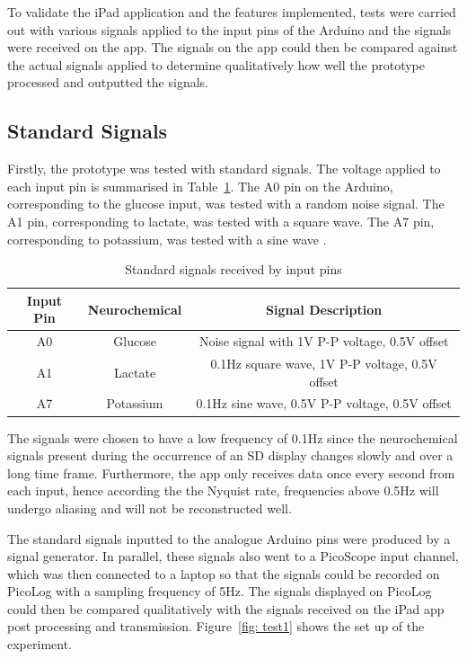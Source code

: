 To validate the iPad application and the features implemented, tests were carried out with various signals applied to the input pins of the Arduino and the signals were received on the app. The signals on the app could then be compared against the actual signals applied to determine qualitatively how well the prototype processed and outputted the signals.



\subsection{Standard Signals}
Firstly, the prototype was tested with standard signals. The voltage applied to each input pin is summarised in Table~\ref{table: standard signals}. The A0 pin on the Arduino, corresponding to the glucose input, was tested with a random noise signal. The A1 pin, corresponding to lactate, was tested with a square wave. The A7 pin, corresponding to potassium, was tested with a sine wave . 

\begin{table}[h!]
\centering
\begin{tabular}{||c c c||} 
 \hline
 Input Pin & Neurochemical & Signal Description \\ [0.5ex] 
 \hline\hline
 A0 & Glucose & Noise signal with 1V P-P voltage, 0.5V offset \\
 A1 & Lactate & 0.1Hz square wave, 1V P-P voltage, 0.5V offset \\
 A7 & Potassium & 0.1Hz sine wave, 0.5V P-P voltage, 0.5V offset \\
 \hline
\end{tabular}
\caption{Standard signals received by input pins}
\label{table: standard signals}
\end{table}

The signals were chosen to have a low frequency of 0.1Hz since the neurochemical signals present during the occurrence of an SD display changes slowly and over a long time frame. Furthermore, the app only receives data once every second from each input, hence according the the Nyquist rate, frequencies above 0.5Hz will undergo aliasing and will not be reconstructed well.

The standard signals inputted to the analogue Arduino pins were produced by a signal generator. In parallel, these signals also went to a PicoScope input channel, which was then connected to a laptop so that the signals could be recorded on PicoLog with a sampling frequency of 5Hz. The signals displayed on PicoLog could then be compared qualitatively with the signals received on the iPad app post processing and transmission. Figure~\ref{fig: test1} shows the set up of the experiment.

